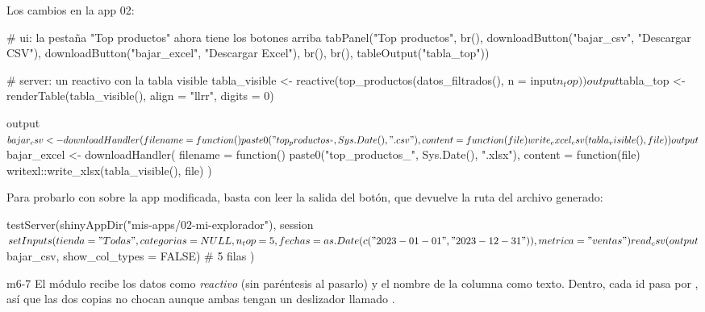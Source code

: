 Los cambios en la app 02:

\begin{rnoejecutar}
# ui: la pestaña "Top productos" ahora tiene los botones arriba
tabPanel("Top productos",
         br(),
         downloadButton("bajar_csv", "Descargar CSV"),
         downloadButton("bajar_excel", "Descargar Excel"),
         br(), br(),
         tableOutput("tabla_top"))

# server: un reactivo con la tabla visible
tabla_visible <- reactive(top_productos(datos_filtrados(), n = input$n_top))

output$tabla_top <- renderTable(tabla_visible(), align = "llrr",
                                digits = 0)

output$bajar_csv <- downloadHandler(
  filename = function() paste0("top_productos_", Sys.Date(), ".csv"),
  content  = function(file) write_excel_csv(tabla_visible(), file)
)
output$bajar_excel <- downloadHandler(
  filename = function() paste0("top_productos_", Sys.Date(), ".xlsx"),
  content  = function(file) writexl::write_xlsx(tabla_visible(), file)
)
\end{rnoejecutar}

Para probarlo con  sobre la app modificada, basta con
leer la salida del botón, que devuelve la ruta del archivo generado:

\begin{rnoejecutar}
testServer(shinyAppDir("mis-apps/02-mi-explorador"), {
  session$setInputs(tienda = "Todas", categorias = NULL, n_top = 5,
                    fechas = as.Date(c("2023-01-01", "2023-12-31")),
                    metrica = "ventas")
  read_csv(output$bajar_csv, show_col_types = FALSE)   # 5 filas
})
\end{rnoejecutar}

\begin{solucion}{m6-7}
El módulo recibe los datos como \emph{reactivo} (sin paréntesis al
pasarlo) y el nombre de la columna como texto. Dentro, cada id pasa por
, así que las dos copias no chocan aunque ambas tengan un
deslizador llamado .
\end{solucion}

